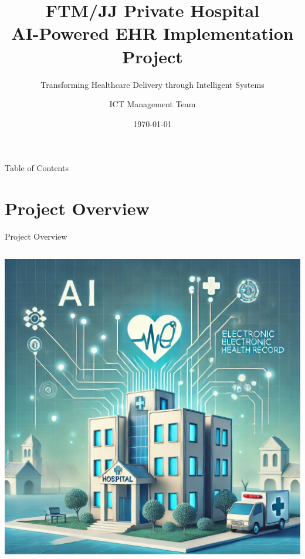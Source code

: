 \documentclass[aspectratio=169]{beamer}
\title{FTM/JJ Private Hospital\\AI-Powered EHR Implementation Project}
\subtitle{Transforming Healthcare Delivery through Intelligent Systems}
\author{ICT Management Team}
\date{\today}
\begin{document}
\begin{frame}
    \titlepage
\end{frame}

\begin{frame}{Table of Contents}
    \begin{multicols}{2}
        \small
        \tableofcontents[hideallsubsections]
    \end{multicols}
\end{frame}

\section{Project Overview}
\begin{frame}{Project Overview}
    \begin{columns}[T]
        \begin{center}
            \includegraphics[height=0.8\textheight]{title_illustration.png}
        \end{center}
    \end{columns}
\end{frame}
\end{document}
